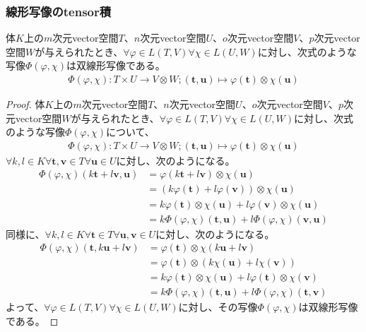 \documentclass[dvipdfmx]{jsarticle}
\begin{document}
\subsubsection{線形写像のtensor積}%
\begin{thm}\label{2.4.5.9}
体$K$上の$m$次元vector空間$T$、$n$次元vector空間$U$、$o$次元vector空間$V$、$p$次元vector空間$W$が与えられたとき、$\forall\varphi \in L(T,V)\forall\chi \in L(U,W)$に対し、次式のような写像$\varPhi(\varphi,\chi)$は双線形写像である。
\begin{align*}
\varPhi(\varphi,\chi):T \times U \rightarrow V \otimes W;\left( \mathbf{t},\mathbf{u} \right) \mapsto \varphi\left( \mathbf{t} \right) \otimes \chi\left( \mathbf{u} \right)
\end{align*}
\end{thm}
\begin{proof}
体$K$上の$m$次元vector空間$T$、$n$次元vector空間$U$、$o$次元vector空間$V$、$p$次元vector空間$W$が与えられたとき、$\forall\varphi \in L(T,V)\forall\chi \in L(U,W)$に対し、次式のような写像$\varPhi(\varphi,\chi)$について、
\begin{align*}
\varPhi(\varphi,\chi):T \times U \rightarrow V \otimes W;\left( \mathbf{t},\mathbf{u} \right) \mapsto \varphi\left( \mathbf{t} \right) \otimes \chi\left( \mathbf{u} \right)
\end{align*}
$\forall k,l \in K\forall\mathbf{t},\mathbf{v} \in T\forall\mathbf{u} \in U$に対し、次のようになる。
\begin{align*}
\varPhi(\varphi,\chi)\left( k\mathbf{t} + l\mathbf{v},\mathbf{u} \right) &= \varphi\left( k\mathbf{t} + l\mathbf{v} \right) \otimes \chi\left( \mathbf{u} \right)\\
&= \left( k\varphi\left( \mathbf{t} \right) + l\varphi\left( \mathbf{v} \right) \right) \otimes \chi\left( \mathbf{u} \right)\\
&= k\varphi\left( \mathbf{t} \right) \otimes \chi\left( \mathbf{u} \right) + l\varphi\left( \mathbf{v} \right) \otimes \chi\left( \mathbf{u} \right)\\
&= k\varPhi(\varphi,\chi)\left( \mathbf{t},\mathbf{u} \right) + l\varPhi(\varphi,\chi)\left( \mathbf{v},\mathbf{u} \right)
\end{align*}
同様に、$\forall k,l \in K\forall\mathbf{t} \in T\forall\mathbf{u},\mathbf{v} \in U$に対し、次のようになる。
\begin{align*}
\varPhi(\varphi,\chi)\left( \mathbf{t},k\mathbf{u} + l\mathbf{v} \right) &= \varphi\left( \mathbf{t} \right) \otimes \chi\left( k\mathbf{u} + l\mathbf{v} \right)\\
&= \varphi\left( \mathbf{t} \right) \otimes \left( k\chi\left( \mathbf{u} \right) + l\chi\left( \mathbf{v} \right) \right)\\
&= k\varphi\left( \mathbf{t} \right) \otimes \chi\left( \mathbf{u} \right) + l\varphi\left( \mathbf{t} \right) \otimes \chi\left( \mathbf{v} \right)\\
&= k\varPhi(\varphi,\chi)\left( \mathbf{t},\mathbf{u} \right) + l\varPhi(\varphi,\chi)\left( \mathbf{t},\mathbf{v} \right)
\end{align*}
よって、$\forall\varphi \in L(T,V)\forall\chi \in L(U,W)$に対し、その写像$\varPhi(\varphi,\chi)$は双線形写像である。
\end{proof}
\end{document}
